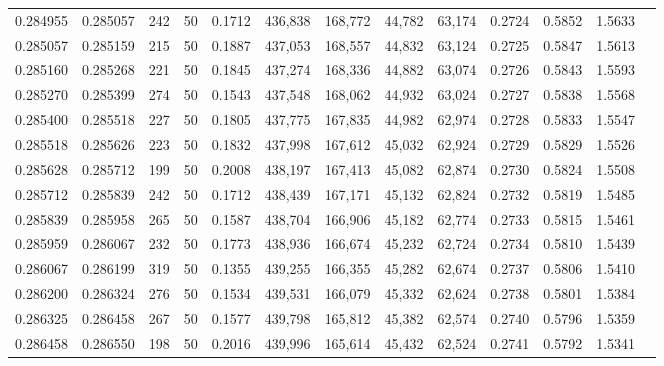 \begin{tabular}{rrrrrrrrrrrrr}
0.284955 & 0.285057 &   242 &  50 &                                     0.1712 & 436,838 & 168,772 &  44,782 &  63,174 & 0.2724 & 0.5852 & 1.5633 \\
0.285057 & 0.285159 &   215 &  50 &                                     0.1887 & 437,053 & 168,557 &  44,832 &  63,124 & 0.2725 & 0.5847 & 1.5613 \\
0.285160 & 0.285268 &   221 &  50 &                                     0.1845 & 437,274 & 168,336 &  44,882 &  63,074 & 0.2726 & 0.5843 & 1.5593 \\
0.285270 & 0.285399 &   274 &  50 &                                     0.1543 & 437,548 & 168,062 &  44,932 &  63,024 & 0.2727 & 0.5838 & 1.5568 \\
0.285400 & 0.285518 &   227 &  50 &                                     0.1805 & 437,775 & 167,835 &  44,982 &  62,974 & 0.2728 & 0.5833 & 1.5547 \\
0.285518 & 0.285626 &   223 &  50 &                                     0.1832 & 437,998 & 167,612 &  45,032 &  62,924 & 0.2729 & 0.5829 & 1.5526 \\
0.285628 & 0.285712 &   199 &  50 &                                     0.2008 & 438,197 & 167,413 &  45,082 &  62,874 & 0.2730 & 0.5824 & 1.5508 \\
0.285712 & 0.285839 &   242 &  50 &                                     0.1712 & 438,439 & 167,171 &  45,132 &  62,824 & 0.2732 & 0.5819 & 1.5485 \\
0.285839 & 0.285958 &   265 &  50 &                                     0.1587 & 438,704 & 166,906 &  45,182 &  62,774 & 0.2733 & 0.5815 & 1.5461 \\
0.285959 & 0.286067 &   232 &  50 &                                     0.1773 & 438,936 & 166,674 &  45,232 &  62,724 & 0.2734 & 0.5810 & 1.5439 \\
0.286067 & 0.286199 &   319 &  50 &                                     0.1355 & 439,255 & 166,355 &  45,282 &  62,674 & 0.2737 & 0.5806 & 1.5410 \\
0.286200 & 0.286324 &   276 &  50 &                                     0.1534 & 439,531 & 166,079 &  45,332 &  62,624 & 0.2738 & 0.5801 & 1.5384 \\
0.286325 & 0.286458 &   267 &  50 &                                     0.1577 & 439,798 & 165,812 &  45,382 &  62,574 & 0.2740 & 0.5796 & 1.5359 \\
0.286458 & 0.286550 &   198 &  50 &                                     0.2016 & 439,996 & 165,614 &  45,432 &  62,524 & 0.2741 & 0.5792 & 1.5341 \\

\end{tabular}
